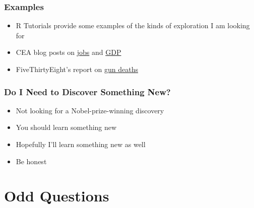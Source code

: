 \documentclass{beamer}
\begin{document}
\begin{frame}
\frametitle{Examples}
    \begin{itemize}[<+- | alert@+>]
        	\item R Tutorials provide some examples of the kinds of exploration I am looking for
        	\item CEA blog posts on \href{https://www.whitehouse.gov/blog/2016/09/02/employment-situation-august}{jobs} and \href{https://www.whitehouse.gov/blog/2016/08/26/second-estimate-gross-domestic-product-second-quarter-2016}{GDP}
        	\item FiveThirtyEight's report on \href{http://fivethirtyeight.com/features/gun-deaths/}{gun deaths}
    \end{itemize}
\end{frame}

\begin{frame}
\frametitle{Do I Need to Discover Something New?}
    \begin{itemize}[<+- | alert@+>]
        	\item Not looking for a Nobel-prize-winning discovery
        	\item You should learn something new
        	\item Hopefully I'll learn something new as well
        	\item Be honest
    \end{itemize}
\end{frame}

\section{Odd Questions}
\end{document}
